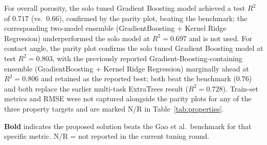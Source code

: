 \documentclass[11pt]{article}
\begin{document}
For overall porosity, the solo tuned Gradient Boosting model achieved a test $R^2$ of $0.717$ (vs.\ $0.66$), confirmed by the parity plot, beating the benchmark; the corresponding two-model ensemble (GradientBoosting + Kernel Ridge Regression) underperformed the solo model at $R^2 = 0.697$ and is not used. For contact angle, the parity plot confirms the solo tuned Gradient Boosting model at test $R^2 = 0.803$, with the previously reported Gradient-Boosting-containing ensemble (GradientBoosting + Kernel Ridge Regression) marginally ahead at $R^2 = 0.806$ and retained as the reported best; both beat the benchmark ($0.76$) and both replace the earlier multi-task ExtraTrees result ($R^2 = 0.728$). Train-set metrics and RMSE were not captured alongside the parity plots for any of the three property targets and are marked N/R in Table~\ref{tab:properties}.

\begin{table}[htbp]
\centering
\caption{Prediction Performance of the ML Models for Membrane Properties}
\label{tab:properties}
\vspace{0.3em}
\begin{flushleft}
\footnotesize \textbf{Bold} indicates the proposed solution beats the Gao et al.\ benchmark for that specific metric. N/R = not reported in the current tuning round.
\end{flushleft}
\end{table}
\end{document}

